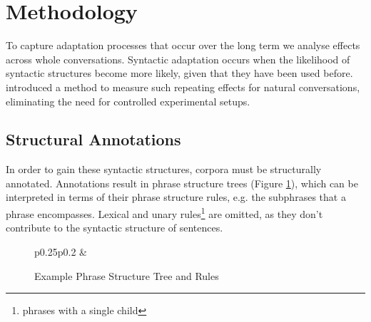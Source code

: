 \documentclass[11pt]{article}
\begin{document}
\section{Methodology}\label{sec:methodology}
To capture adaptation processes that occur over the long term we analyse effects across whole conversations. Syntactic adaptation occurs when the likelihood of syntactic structures become more likely, given that they have been used before. \citealp{reitter2008context} introduced a method to measure such repeating effects for natural conversations, eliminating the need for controlled experimental setups.

\subsection{Structural Annotations}
In order to gain these syntactic structures, corpora must be structurally annotated. Annotations result in phrase structure trees (Figure \ref{fig:tree}), which can be interpreted in terms of their phrase structure rules, e.g. the subphrases that a phrase encompasses. Lexical and unary rules\footnote{phrases with a single child} are omitted, as they don't contribute to the syntactic structure of sentences. 
\begin{figure}
  \begin{tabular}{p{}p{}}
    &
    \begin{center}
        
      \end{center}
      
    \end{tabular}
  \caption{Example Phrase Structure Tree and Rules}
  \label{fig:tree}
  
\end{figure}
\end{document}
